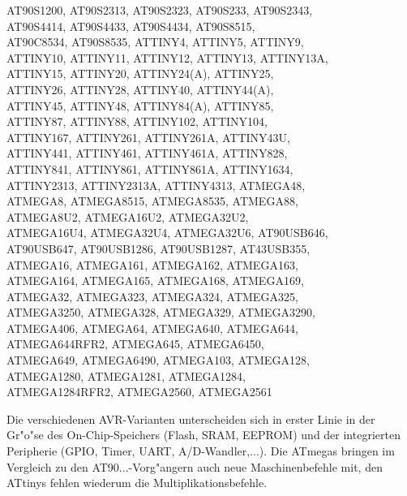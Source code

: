 \documentclass[12pt,a4paper,twoside]{report}
\begin{document}
\begin{cpulist}
   AT90S1200, AT90S2313, AT90S2323, AT90S233, AT90S2343,\\
\> AT90S4414, AT90S4433, AT90S4434, AT90S8515,\\
\> AT90C8534, AT90S8535, ATTINY4, ATTINY5, ATTINY9,\\
\> ATTINY10, ATTINY11, ATTINY12, ATTINY13, ATTINY13A,\\
\> ATTINY15, ATTINY20, ATTINY24(A), ATTINY25,\\
\> ATTINY26, ATTINY28, ATTINY40, ATTINY44(A),\\
\> ATTINY45, ATTINY48, ATTINY84(A), ATTINY85,\\
\> ATTINY87, ATTINY88, ATTINY102, ATTINY104,\\
\> ATTINY167, ATTINY261, ATTINY261A, ATTINY43U,\\
\> ATTINY441, ATTINY461, ATTINY461A, ATTINY828,\\
\> ATTINY841, ATTINY861, ATTINY861A, ATTINY1634,\\
\> ATTINY2313, ATTINY2313A, ATTINY4313, ATMEGA48,\\
\> ATMEGA8, ATMEGA8515, ATMEGA8535, ATMEGA88,\\
\> ATMEGA8U2, ATMEGA16U2, ATMEGA32U2,\\
\> ATMEGA16U4, ATMEGA32U4, ATMEGA32U6, AT90USB646,\\
\> AT90USB647, AT90USB1286, AT90USB1287, AT43USB355,\\
\> ATMEGA16, ATMEGA161, ATMEGA162, ATMEGA163,\\
\> ATMEGA164, ATMEGA165, ATMEGA168, ATMEGA169,\\
\> ATMEGA32, ATMEGA323, ATMEGA324, ATMEGA325,\\
\> ATMEGA3250, ATMEGA328, ATMEGA329, ATMEGA3290,\\
\> ATMEGA406, ATMEGA64, ATMEGA640, ATMEGA644,\\
\> ATMEGA644RFR2, ATMEGA645, ATMEGA6450,\\
\> ATMEGA649, ATMEGA6490, ATMEGA103, ATMEGA128,\\
\> ATMEGA1280, ATMEGA1281, ATMEGA1284,\\
\> ATMEGA1284RFR2, ATMEGA2560, ATMEGA2561
\end{cpulist}
Die verschiedenen AVR-Varianten unterscheiden sich in erster Linie in
der Gr"o"se des On-Chip-Speichers (Flash, SRAM, EEPROM) und der integrierten
Peripherie (GPIO, Timer, UART, A/D-Wandler,...).  Die ATmegas bringen im
Vergleich zu den AT90...-Vorg"angern auch neue Maschinenbefehle
mit, den ATtinys fehlen wiederum die Multiplikationsbefehle.
\end{document}
